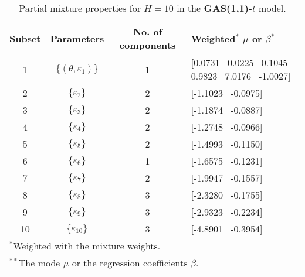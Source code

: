 \footnotesize{  
{ \renewcommand{\arraystretch}{1.2} 
\begin{longtable}{cccp{3.6cm}} 
\caption{Partial mixture properties for $H=10$ in the \textbf{GAS(1,1)-$t$} model.} 
\label{tab:pmits_t_gas} \\ 
 Subset & Parameters & No. of components  & Weighted$^{*}$ $\mu$ or $\beta$$^{*}$ \\ \hline 
1 & $\{(\theta,\varepsilon_{1})\}$ & 1 & [0.0731 \, 0.0225 \, 0.1045 \, 0.9823 \, 7.0176 \, -1.0027]   \\ [1ex] 
2 & $\{\varepsilon_{2}\}$ & 2 & [-1.1023 \, -0.0975]   \\ [1ex] 
3 & $\{\varepsilon_{3}\}$ & 2 & [-1.1874 \, -0.0887]   \\ [1ex] 
4 & $\{\varepsilon_{4}\}$ & 2 & [-1.2748 \, -0.0966]   \\ [1ex] 
5 & $\{\varepsilon_{5}\}$ & 2 & [-1.4993 \, -0.1150]   \\ [1ex] 
6 & $\{\varepsilon_{6}\}$ & 1 & [-1.6575 \, -0.1231]   \\ [1ex] 
7 & $\{\varepsilon_{7}\}$ & 2 & [-1.9947 \, -0.1557]   \\ [1ex] 
8 & $\{\varepsilon_{8}\}$ & 3 & [-2.3280 \, -0.1755]   \\ [1ex] 
9 & $\{\varepsilon_{9}\}$ & 3 & [-2.9323 \, -0.2234]   \\ [1ex] 
10 & $\{\varepsilon_{10}\}$ & 3 & [-4.8901 \, -0.3954]   \\ [1ex] 
\hline 
 \multicolumn{4}{l}{\footnotesize{$^{*}$Weighted with the mixture weights.}} \\ 
 \multicolumn{4}{l}{\footnotesize{$^{**}$The mode $\mu$ or the regression coefficients $\beta$.}} \\ 
\end{longtable} 
} 
} 
\normalsize 
